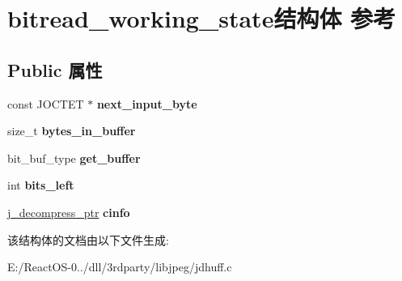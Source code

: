 \hypertarget{structbitread__working__state}{}\section{bitread\+\_\+working\+\_\+state结构体 参考}
\label{structbitread__working__state}
\subsection*{Public 属性}
\begin{DoxyCompactItemize}
\item 
\mbox{\label{structbitread__working__state_a663f17ba1c850439118605f1842b2fbf}} 
const J\+O\+C\+T\+ET $\ast$ {\bfseries next\+\_\+input\+\_\+byte}
\item 
\mbox{\label{structbitread__working__state_a9564d55e83f5b154a50a84ffb4e45809}} 
size\+\_\+t {\bfseries bytes\+\_\+in\+\_\+buffer}
\item 
\mbox{\label{structbitread__working__state_a1b14cadab00deca48688b336c6a48664}} 
bit\+\_\+buf\+\_\+type {\bfseries get\+\_\+buffer}
\item 
\mbox{\label{structbitread__working__state_a3744bcf2fb8bc73560ea6e4d083cf6ff}} 
int {\bfseries bits\+\_\+left}
\item 
\mbox{\label{structbitread__working__state_ae6ed0f717c279eac7ac54cec32cfaa3e}} 
\hyperlink{structjpeg__decompress__struct}{j\+\_\+decompress\+\_\+ptr} {\bfseries cinfo}
\end{DoxyCompactItemize}


该结构体的文档由以下文件生成\+:\begin{DoxyCompactItemize}
\item 
E\+:/\+React\+O\+S-\/0../dll/3rdparty/libjpeg/jdhuff.\+c\end{DoxyCompactItemize}
